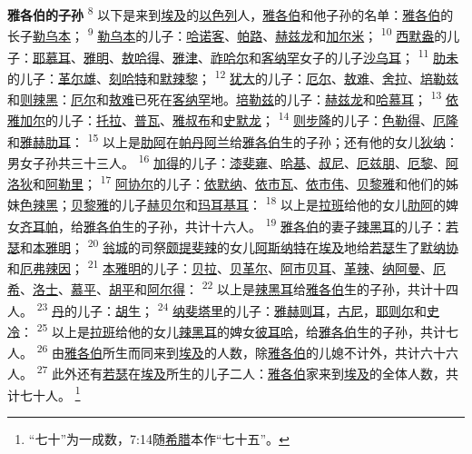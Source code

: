 \textbf{雅各伯的子孙 }
\textsuperscript{8}
以下是来到\uline{埃及}的\uline{以色列}人，\uline{雅各伯}和他子孙的名单：\uline{雅各伯}的长子\uline{勒乌本}；
\textsuperscript{9}
\uline{勒乌本}的儿子：\uline{哈诺客}、\uline{帕路}、\uline{赫兹龙}和\uline{加尔米}；
\textsuperscript{10}
\uline{西默盎}的儿子：\uline{耶慕耳}、\uline{雅明}、\uline{敖哈得}、\uline{雅津}、\uline{祚哈尔}和\uline{客纳罕}女子的儿子\uline{沙乌耳}；
\textsuperscript{11}
\uline{肋未}的儿子：\uline{革尔雄}、\uline{刻哈特}和\uline{默辣黎}；
\textsuperscript{12}
\uline{犹大}的儿子：\uline{厄尔}、\uline{敖难}、\uline{舍拉}、\uline{培勒兹}和\uline{则辣黑}：\uline{厄尔}和\uline{敖难}已死在\uline{客纳罕}地。\uline{培勒兹}的儿子：\uline{赫兹龙}和\uline{哈慕耳}；
\textsuperscript{13}
\uline{依雅}\uline{加尔}的儿子：\uline{托拉}、\uline{普瓦}、\uline{雅叔布}和\uline{史默龙}；
\textsuperscript{14}
\uline{则步隆}的儿子：\uline{色勒得}、\uline{厄隆}和\uline{雅赫肋耳}：
\textsuperscript{15}
以上是\uline{肋阿}在\uline{帕丹}\uline{阿兰}给\uline{雅各伯}生的子孙；还有他的女儿\uline{狄纳}：男女子孙共三十三人。
\textsuperscript{16}
\uline{加得}的儿子：\uline{漆斐雍}、\uline{哈基}、\uline{叔尼}、\uline{厄兹朋}、\uline{厄黎}、\uline{阿洛狄}和\uline{阿勒里}；
\textsuperscript{17}
\uline{阿协尔}的儿子：\uline{依默纳}、\uline{依市瓦}、\uline{依市伟}、\uline{贝黎雅}和他们的姊妹\uline{色辣黑}；\uline{贝黎雅}的儿子\uline{赫贝尔}和\uline{玛耳基耳}：
\textsuperscript{18}
以上是\uline{拉班}给他的女儿\uline{肋阿}的婢女\uline{齐耳帕}，给\uline{雅各伯}生的子孙，共计十六人。
\textsuperscript{19}
\uline{雅各伯}的妻子\uline{辣黑耳}的儿子：\uline{若瑟}和\uline{本雅明}；
\textsuperscript{20}
\uline{翁城}的司祭\uline{颇提斐辣}的女儿\uline{阿斯}\uline{纳特}在\uline{埃及}地给\uline{若瑟}生了\uline{默纳协}和\uline{厄弗辣因}；
\textsuperscript{21}
\uline{本雅明}的儿子：\uline{贝拉}、\uline{贝革尔}、\uline{阿市贝耳}、\uline{革辣}、\uline{纳阿曼}、\uline{厄希}、\uline{洛士}、\uline{慕平}、\uline{胡平}和\uline{阿尔得}：
\textsuperscript{22}
以上是\uline{辣黑耳}给\uline{雅各伯}生的子孙，共计十四人。
\textsuperscript{23}
\uline{丹}的儿子：\uline{胡生}；
\textsuperscript{24}
\uline{纳斐塔里}的儿子：\uline{雅赫则耳}，\uline{古尼}，\uline{耶则尔}和\uline{史冷}：
\textsuperscript{25}
以上是\uline{拉班}给他的女儿\uline{辣黑耳}的婢女\uline{彼耳哈}，给\uline{雅各伯}生的子孙，共计七人。
\textsuperscript{26}
由\uline{雅各伯}所生而同来到\uline{埃及}的人数，除\uline{雅各伯}的儿媳不计外，共计六十六人。
\textsuperscript{27}
此外还有\uline{若瑟}在\uline{埃及}所生的儿子二人：\uline{雅各伯}家来到\uline{埃及}的全体人数，共计七十人。
\footnote{“七十”为一成数，7:14随\uline{希腊}本作“七十五”。}

